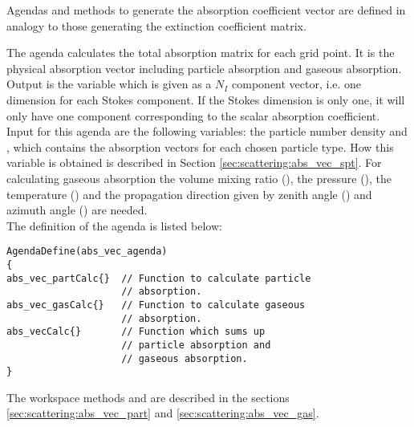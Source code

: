 \label{sec:scattering:abs_vec}

Agendas and methods to generate the absorption coefficient vector are
defined in analogy to those generating the extinction coefficient matrix.

\label{sec:scattering:abs_vec_agenda}

The agenda  calculates the total absorption
matrix \AbsVec{}
for each grid point. It is the physical absorption vector including
particle absorption and gaseous absorption.\\
Output is the variable  which is given
as a $N_I$ component vector, i.e. one dimension for each Stokes component. If the
Stokes dimension is only one, it will only have one component
corresponding to the scalar absorption coefficient. \\
Input for this agenda are the following variables:
the particle number density  and 
, which contains the absorption vectors  for
each chosen particle type. How this variable is obtained
is described in Section \ref{sec:scattering:abs_vec_spt}. For calculating 
gaseous absorption the volume mixing ratio (), the
pressure  (), the temperature  () and the
propagation direction given by zenith angle () and
azimuth angle () are needed.\\
The definition of the agenda is listed below:

\vspace{2ex} 
\begin{minipage}[h]{.9\hsize}
\begin{verbatim}
AgendaDefine(abs_vec_agenda)
{
abs_vec_partCalc{}  // Function to calculate particle
                    // absorption.
abs_vec_gasCalc{}   // Function to calculate gaseous
                    // absorption.
abs_vecCalc{}       // Function which sums up 
                    // particle absorption and
                    // gaseous absorption.
}
\end{verbatim}
\end{minipage}
\vspace{2ex} 

\noindent
The workspace methods  and
 are described in the sections
\ref{sec:scattering:abs_vec_part} and
\ref{sec:scattering:abs_vec_gas}. 



